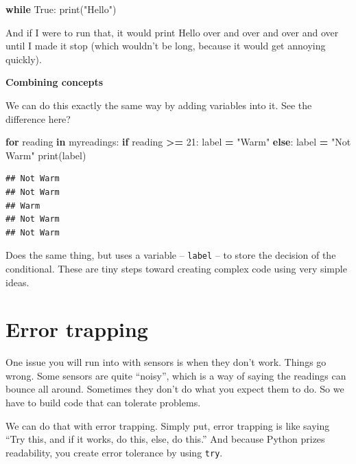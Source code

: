 \documentclass[
]{book}
\newenvironment{Shaded}{\begin{snugshade}}{\end{snugshade}}
\newcommand{\BuiltInTok}[1]{#1}
\newcommand{\ControlFlowTok}[1]{\textcolor[rgb]{0.13,0.29,0.53}{\textbf{#1}}}
\newcommand{\DecValTok}[1]{\textcolor[rgb]{0.00,0.00,0.81}{#1}}
\newcommand{\KeywordTok}[1]{\textcolor[rgb]{0.13,0.29,0.53}{\textbf{#1}}}
\newcommand{\NormalTok}[1]{#1}
\newcommand{\OperatorTok}[1]{\textcolor[rgb]{0.81,0.36,0.00}{\textbf{#1}}}
\newcommand{\StringTok}[1]{\textcolor[rgb]{0.31,0.60,0.02}{#1}}
\newcommand{\VariableTok}[1]{\textcolor[rgb]{0.00,0.00,0.00}{#1}}
\begin{document}
\begin{Shaded}
\begin{Highlighting}[]
\ControlFlowTok{while} \VariableTok{True}\NormalTok{:}
    \BuiltInTok{print}\NormalTok{(}\StringTok{"Hello"}\NormalTok{)}
\end{Highlighting}
\end{Shaded}

And if I were to run that, it would print Hello over and over and over and over until I made it stop (which wouldn't be long, because it would get annoying quickly).

\textbf{Combining concepts}

We can do this exactly the same way by adding variables into it. See the difference here?

\begin{Shaded}
\begin{Highlighting}[]
\ControlFlowTok{for}\NormalTok{ reading }\KeywordTok{in}\NormalTok{ myreadings:}
    \ControlFlowTok{if}\NormalTok{ reading }\OperatorTok{>=} \DecValTok{21}\NormalTok{:}
\NormalTok{        label }\OperatorTok{=} \StringTok{"Warm"}
    \ControlFlowTok{else}\NormalTok{:}
\NormalTok{        label }\OperatorTok{=} \StringTok{"Not Warm"}
    \BuiltInTok{print}\NormalTok{(label)}
\end{Highlighting}
\end{Shaded}

\begin{verbatim}
## Not Warm
## Not Warm
## Warm
## Not Warm
## Not Warm
\end{verbatim}

Does the same thing, but uses a variable -- \texttt{label} -- to store the decision of the conditional. These are tiny steps toward creating complex code using very simple ideas.

\hypertarget{error-trapping}{%
\section{Error trapping}\label{error-trapping}}

One issue you will run into with sensors is when they don't work. Things go wrong. Some sensors are quite ``noisy'', which is a way of saying the readings can bounce all around. Sometimes they don't do what you expect them to do. So we have to build code that can tolerate problems.

We can do that with error trapping. Simply put, error trapping is like saying ``Try this, and if it works, do this, else, do this.'' And because Python prizes readability, you create error tolerance by using \texttt{try}.
\end{document}
